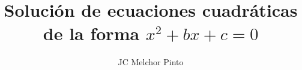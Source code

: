 \documentclass[12pt,addpoints,answers]{guia}
\title{Solución de ecuaciones cuadráticas de la forma $x^2+bx+c=0$}
\author{JC Melchor Pinto}
\begin{document}
\pagestyle{headandfoot}
\INFO%
\begin{multicols}{2}%
\end{multicols}%
\begin{questions}
    \questionboxed[10]{}
    \questionboxed[10]{}
    \questionboxed[10]{}
    \questionboxed[20]{}
    \questionboxed[20]{}
    \questionboxed[10]{}
    \questionboxed[20]{}
\end{questions}
\end{document}
